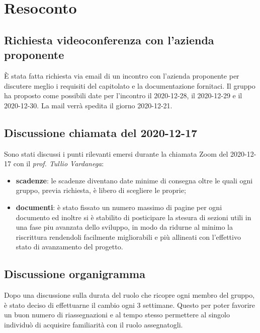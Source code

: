 \newpage


\section{Resoconto}

\subsection{Richiesta videoconferenza con l'azienda proponente}

È stata fatta richiesta via email di un incontro con l'azienda proponente \newline
per discutere meglio i requisiti del capitolato \NomeProgetto{} \newline
e la documentazione fornitaci.\newline
Il gruppo ha proposto come possibili date per l'incontro il 2020-12-28, il 2020-12-29 e il 2020-12-30.\newline
La mail verrà spedita il giorno 2020-12-21.

\subsection{Discussione chiamata del 2020-12-17}

Sono stati discussi i punti rilevanti emersi durante la chiamata Zoom del 2020-12-17 \newline
con il \textit{prof. Tullio Vardanega}:
\begin{itemize}
	\item \textbf{scadenze}: le scadenze diventano date minime di consegna oltre le quali ogni gruppo, previa richiesta, è libero di scegliere le proprie;
	\item \textbf{documenti}: è stato fissato un numero massimo di pagine per ogni documento ed inoltre si è stabilito di posticipare la stesura di sezioni utili in una fase piu avanzata dello sviluppo, in modo da ridurne al minimo la riscrittura rendendoli facilmente migliorabili e più allineati con l'effettivo stato di avanzamento del progetto.
\end{itemize}

\subsection{Discussione organigramma}

Dopo una discussione sulla durata del ruolo che ricopre ogni membro del gruppo, è stato deciso di effettuarne il cambio ogni 3 settimane.
Questo per poter favorire un buon numero di riassegnazioni e al tempo stesso permettere al singolo individuò di acquisire familiarità con il ruolo assegnatogli.

